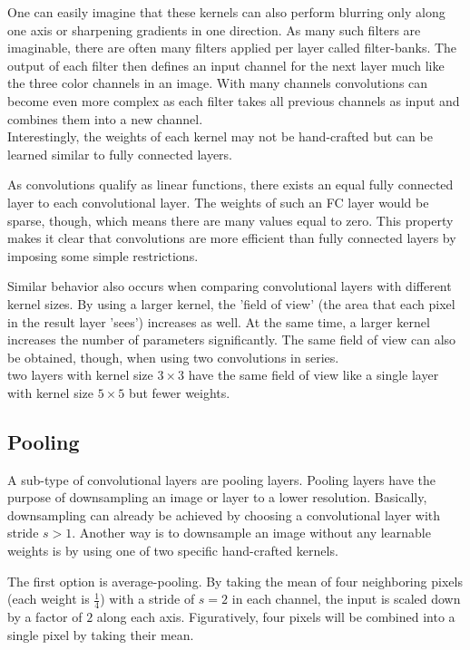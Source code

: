 One can easily imagine that these kernels can also perform blurring only along one axis or sharpening gradients in one direction.
As many such filters are imaginable, there are often many filters applied per layer called filter-banks.
The output of each filter then defines an input channel for the next layer much like the three color channels in an image.
With many channels convolutions can become even more complex as each filter takes all previous channels as input and combines them into a new channel.\\
Interestingly, the weights of each kernel may not be hand-crafted but can be learned similar to fully connected layers.

As convolutions qualify as linear functions, there exists an equal fully connected layer to each convolutional layer.
The weights of such an FC layer would be sparse, though, which means there are many values equal to zero.
This property makes it clear that convolutions are more efficient than fully connected layers by imposing some simple restrictions.

Similar behavior also occurs when comparing convolutional layers with different kernel sizes.
By using a larger kernel, the 'field of view' (the area that each pixel in the result layer 'sees') increases as well.
At the same time, a larger kernel increases the number of parameters significantly.
The same field of view can also be obtained, though, when using two convolutions in series.\\
\eg two layers with kernel size $3 \times 3$ have the same field of view like a single layer with kernel size $5 \times 5$ but fewer weights.

\subsection{Pooling}
A sub-type of convolutional layers are pooling layers.
Pooling layers have the purpose of downsampling an image or layer to a lower resolution.
Basically, downsampling can already be achieved by choosing a convolutional layer with stride $s > 1$.
Another way is to downsample an image without any learnable weights is by using one of two specific hand-crafted kernels.

The first option is average-pooling.
By taking the mean of four neighboring pixels (each weight is $\frac{1}{4}$) with a stride of $s = 2$ in each channel, the input is scaled down by a factor of $2$ along each axis.
Figuratively, four pixels will be combined into a single pixel by taking their mean.


